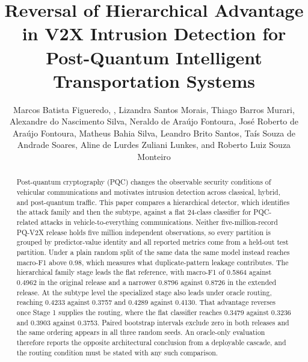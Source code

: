 \documentclass{IEEEoj}
\begin{document}
\doiinfo{}
\title{Reversal of Hierarchical Advantage in V2X Intrusion Detection for Post-Quantum Intelligent Transportation Systems}

\author{Marcos Batista Figueredo, ,
Lizandra Santos Morais,
Thiago Barros Murari,
Alexandre do Nascimento Silva,
Neraldo de Ara\'{u}jo Fontoura,
Jos\'{e} Roberto de Ara\'{u}jo Fontoura,
Matheus Bahia Silva,
Leandro Brito Santos,
Ta\'{i}s Souza de Andrade Soares,
Aline de Lurdes Zuliani Lunkes,
and Roberto Luiz Souza Monteiro}


\begin{abstract}
Post-quantum cryptography (PQC) changes the observable security conditions of vehicular communications and motivates intrusion detection across classical, hybrid, and post-quantum traffic. This paper compares a hierarchical detector, which identifies the attack family and then the subtype, against a flat 24-class classifier for PQC-related attacks in vehicle-to-everything communications. Neither five-million-record PQ-V2X release holds five million independent observations, so every partition is grouped by predictor-value identity and all reported metrics come from a held-out test partition. Under a plain random split of the same data the same model instead reaches macro-F1 above 0.98, which measures what duplicate-pattern leakage contributes. The hierarchical family stage leads the flat reference, with macro-F1 of 0.5864 against 0.4962 in the original release and a narrower 0.8796 against 0.8726 in the extended release. At the subtype level the specialized stage also leads under oracle routing, reaching 0.4233 against 0.3757 and 0.4289 against 0.4130. That advantage reverses once Stage 1 supplies the routing, where the flat classifier reaches 0.3479 against 0.3236 and 0.3903 against 0.3753. Paired bootstrap intervals exclude zero in both releases and the same ordering appears in all three random seeds. An oracle-only evaluation therefore reports the opposite architectural conclusion from a deployable cascade, and the routing condition must be stated with any such comparison.
\end{abstract}
\end{document}
